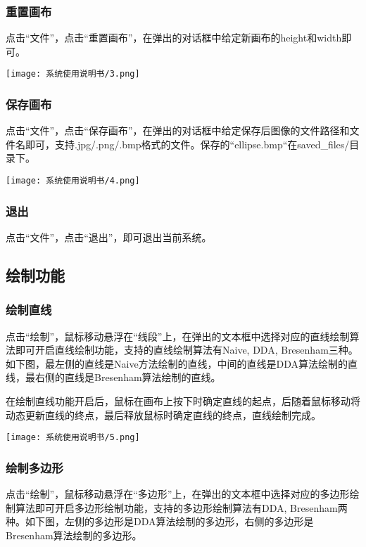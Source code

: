 \documentclass{article}
\begin{document}
		\subsubsection{重置画布}
		点击“文件”，点击“重置画布”，在弹出的对话框中给定新画布的height和width即可。
		\begin{center}
			\texttt{[image: 系统使用说明书/3.png]}
		\end{center}
	
		\subsubsection{保存画布}
		点击“文件”，点击“保存画布”，在弹出的对话框中给定保存后图像的文件路径和文件名即可，支持.jpg/.png/.bmp格式的文件。保存的“ellipse.bmp“在saved\_files/目录下。
		\begin{center}
			\texttt{[image: 系统使用说明书/4.png]}
		\end{center}
	
		\subsubsection{退出}
		点击“文件”，点击“退出”，即可退出当前系统。
		
		\subsection{绘制功能}
		\subsubsection{绘制直线}
		点击“绘制”，鼠标移动悬浮在“线段”上，在弹出的文本框中选择对应的直线绘制算法即可开启直线绘制功能，支持的直线绘制算法有Naive, DDA, Bresenham三种。如下图，最左侧的直线是Naive方法绘制的直线，中间的直线是DDA算法绘制的直线，最右侧的直线是Bresenham算法绘制的直线。
		
		在绘制直线功能开启后，鼠标在画布上按下时确定直线的起点，后随着鼠标移动将动态更新直线的终点，最后释放鼠标时确定直线的终点，直线绘制完成。
		\begin{center}
			\texttt{[image: 系统使用说明书/5.png]}
		\end{center}
		
		\subsubsection{绘制多边形}
		点击“绘制”，鼠标移动悬浮在“多边形”上，在弹出的文本框中选择对应的多边形绘制算法即可开启多边形绘制功能，支持的多边形绘制算法有DDA, Bresenham两种。如下图，左侧的多边形是DDA算法绘制的多边形，右侧的多边形是Bresenham算法绘制的多边形。
		
\end{document}
